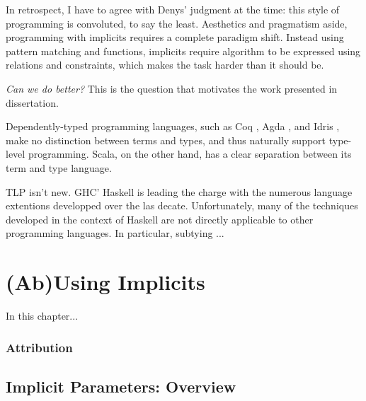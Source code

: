In retrospect, I have to agree with Denys' judgment at the time: this style of programming is convoluted, to say the least.
Aesthetics and pragmatism aside, programming with implicits requires a complete paradigm shift.
Instead using pattern matching and functions, implicits require algorithm to be expressed using relations and constraints, which makes the task harder than it should be.

\emph{Can we do better?} This is the question that motivates the work presented in dissertation.

Dependently-typed programming languages, such as Coq \citep{bertot2004interactive}, Agda \citep{norell2007towards}, and Idris \citep{brady2015idris}, make no distinction between terms and types, and thus naturally support type-level programming.
Scala, on the other hand, has a clear separation between its term and type language.


TLP isn't new. GHC' Haskell is leading the charge with the numerous language extentions developped over the las decate. Unfortunately, many of the techniques developed in the context of Haskell are not directly applicable to other programming languages. In particular, subtying ...



\lipsum[1]

\chapter{(Ab)Using Implicits}
\label{chap:ab-using-implicits}

In this chapter...

\subsection*{Attribution}
\citep{odersky2018simplicitly}

\section{Implicit Parameters: Overview}

